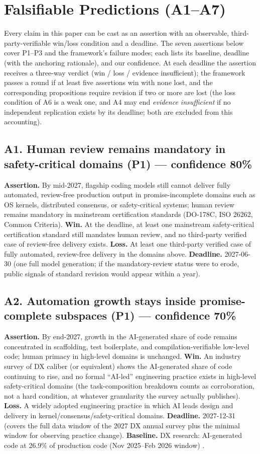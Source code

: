 \documentclass[11pt]{article}
\begin{document}
\appendix
\section{Falsifiable Predictions (A1--A7)}
\label{app:predictions}
Every claim in this paper can be cast as an assertion with an observable,
third-party-verifiable win/loss condition and a deadline. The seven
assertions below cover P1--P3 and the framework's failure modes; each
lists its baseline, deadline (with the anchoring rationale), and our
confidence. At each deadline the assertion receives a three-way verdict
(win / loss / evidence insufficient); the framework passes a round if at
least five assertions win with none lost, and the corresponding
propositions require revision if two or more are lost (the loss condition
of A6 is a weak one, and A4 may end \emph{evidence insufficient} if no
independent replication exists by its deadline; both are excluded from
this accounting).

\subsection*{A1. Human review remains mandatory in safety-critical domains
(P1) --- confidence 80\%}
\textbf{Assertion.} By mid-2027, flagship coding models still cannot
deliver fully automated, review-free production output in
promise-incomplete domains such as OS kernels, distributed consensus, or
safety-critical systems; human review remains mandatory in mainstream
certification standards (DO-178C, ISO 26262, Common Criteria).
\textbf{Win.} At the deadline, at least one mainstream safety-critical
certification standard still mandates human review, and no third-party
verified case of review-free delivery exists. \textbf{Loss.} At least one
third-party verified case of fully automated, review-free delivery in the
domains above. \textbf{Deadline.} 2027-06-30 (one full model generation;
if the mandatory-review status were to erode, public signals of standard
revision would appear within a year).

\subsection*{A2. Automation growth stays inside promise-complete
subspaces (P1) --- confidence 70\%}
\textbf{Assertion.} By end-2027, growth in the AI-generated share of code
remains concentrated in scaffolding, test boilerplate, and
compilation-verifiable low-level code; human primacy in high-level domains
is unchanged. \textbf{Win.} An industry survey of DX caliber (or equivalent) shows the
AI-generated share of code continuing to rise, and no formal ``AI-led''
engineering practice exists in high-level safety-critical domains (the
task-composition breakdown counts as corroboration, not a hard condition,
at whatever granularity the survey actually publishes). \textbf{Loss.} A widely adopted engineering practice in which AI
leads design and delivery in kernel/consensus/safety-critical domains.
\textbf{Deadline.} 2027-12-31 (covers the full data window of the 2027 DX
annual survey plus the minimal window for observing practice change).
\textbf{Baseline.} DX research: AI-generated code at 26.9\% of production
code (Nov 2025--Feb 2026 window) \cite{dx}.
\end{document}
